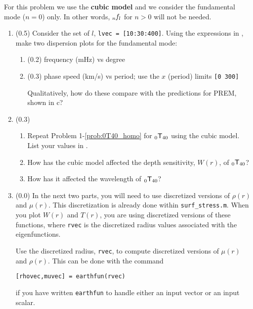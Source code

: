 \documentclass[11pt,titlepage,fleqn]{article}
\newcommand{\tnl}[2]{\mbox{$_{#1}\ssT_{#2}$}}
\newcommand{\fnl}{\mbox{${}_{n\hspace{-0.2 mm}}f_l$}}        %
\begin{document}
For this problem we use the {\bf cubic model} and we consider the fundamental mode ($n=0$) only. In other words, $\fnl$ for $n > 0$ will not be needed.

\begin{enumerate}
\item (0.5) Consider the set of $l$, \verb+lvec = [10:30:400]+. Using the expressions in , make two dispersion plots for the fundamental mode:
%
\begin{enumerate}
\item (0.2) frequency (mHz) vs degree

\item (0.3) phase speed (km/s) vs period; use the $x$ (period) limits \verb+[0 300]+

Qualitatively, how do these compare with the predictions for PREM, shown in c?
\end{enumerate}

\item (0.3)
%
\begin{enumerate}
\item Repeat Problem 1-\ref{prob:0T40_homo} for \tnl{0}{40} using the cubic model. List your values in .
\item How has the cubic model affected the depth sensitivity, $W(r)$, of \tnl{0}{40}?
\item How has it affected the wavelength of \tnl{0}{40}?
\end{enumerate}

\label{prob:0T40_cubic}


\item (0.0) In the next two parts, you will need to use discretized versions of $\rho(r)$ and $\mu(r)$. This discretization is already done within \verb+surf_stress.m+. When you plot $W(r)$ and $T(r)$, you are using discretized versions of these functions, where \verb+rvec+ is the discretized radius values associated with the eigenfunctions.

Use the discretized radius, \verb+rvec+, to compute discretized versions of $\mu(r)$ and $\rho(r)$. This can be done with the command
%
\begin{verbatim}
[rhovec,muvec] = earthfun(rvec)
\end{verbatim}
%
if you have written \verb+earthfun+ to handle either an input vector or an input scalar.



\end{enumerate}
\end{document}

